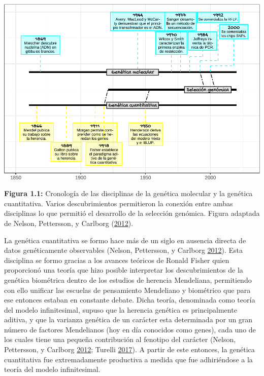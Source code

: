 \documentclass[11pt,spanish,a4paper,oneside,]{book} %
\begin{document}
\begin{center}\includegraphics[width=1\linewidth]{figures/Crono} \end{center}

\begin{center}
\textbf{Figura 1.1:} Cronología de las disciplinas de la genética molecular y la genética cuantitativa. Varios descubrimientos permitieron la conexión entre ambas disciplinas lo que permitió el desarrollo de la selección genómica. Figura adaptada de Nelson, Pettersson, y Carlborg (\protect\hyperlink{ref-cite:2}{2012}).

\end{center}

La genética cuantitativa se formo hace más de un siglo en ausencia directa de datos genéticamente observables (Nelson, Pettersson, y Carlborg \protect\hyperlink{ref-cite:2}{2012}). Esta disciplina se formo gracias a los avances teóricos de Ronald Fisher quien proporcionó una teoría que hizo posible interpretar los descubrimientos de la genética biométrica dentro de los estudios de herencia Mendeliana, permitiendo con ello unificar las escuelas de pensamiento Mendeliano y biométrico que para ese entonces estaban en constante debate. Dicha teoría, denominada como teoría del modelo infinitesimal, supuso que la herencia genética es principalmente aditiva, y que la varianza genética de un carácter esta determinada por un gran número de factores Mendelianos (hoy en día conocidos como genes), cada uno de los cuales tiene una pequeña contribución al fenotipo del carácter (Nelson, Pettersson, y Carlborg \protect\hyperlink{ref-cite:2}{2012}; Turelli \protect\hyperlink{ref-cite:9}{2017}). A partir de este entonces, la genética cuantitativa fue extremadamente productiva a medida que fue adhiriéndose a la teoría del modelo infinitesimal.
\end{document}
